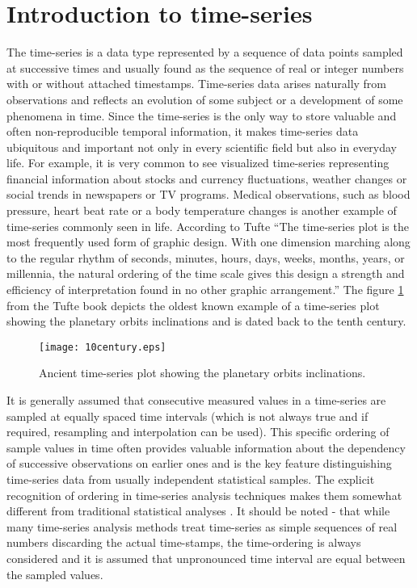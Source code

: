 \section{Introduction to time-series}
The time-series is a data type represented by a sequence of data points sampled at successive times and usually found as the sequence of real or integer numbers with or without attached timestamps. Time-series data arises naturally from observations and reflects an evolution of some subject or a development of some phenomena in time. Since the time-series is the only way to store valuable and often non-reproducible temporal information, it makes time-series data ubiquitous and important not only in every scientific field but also in everyday life. For example, it is very common to see visualized time-series representing financial information about stocks and currency fluctuations, weather changes or social trends in newspapers or TV programs. Medical observations, such as blood pressure, heart beat rate or a body temperature changes is another example of time-series commonly seen in life. According to Tufte \cite{citeulike:1454223} ``The time-series plot is the most frequently used form of graphic design. With one dimension marching along to the regular rhythm of seconds, minutes, hours, days, weeks, months, years, or millennia, the natural ordering of the time scale gives this design a strength and efficiency of interpretation found in no other graphic arrangement.'' The figure \ref{fig:10century} from the Tufte book depicts the oldest known example of a time-series plot showing the planetary orbits inclinations and is dated back to the tenth century.
\begin{figure}[tbp]
   \centering
   \texttt{[image: 10century.eps]}
   \caption{Ancient time-series plot showing the planetary orbits inclinations.}
   \label{fig:10century}
\end{figure} 

It is generally assumed that consecutive measured values in a time-series are sampled at equally spaced time intervals (which is not always true and if required, resampling and interpolation can be used). This specific ordering of sample values in time often provides valuable information about the dependency of successive observations on earlier ones and is the key feature distinguishing time-series data from usually independent statistical samples. 
The explicit recognition of ordering in time-series analysis techniques makes them somewhat different from traditional statistical analyses \cite{citeulike:3989988}. It should be noted - that while many time-series analysis methods treat time-series as simple sequences of real numbers discarding the actual time-stamps, the time-ordering is always considered and it is assumed that unpronounced time interval are equal between the sampled values.

